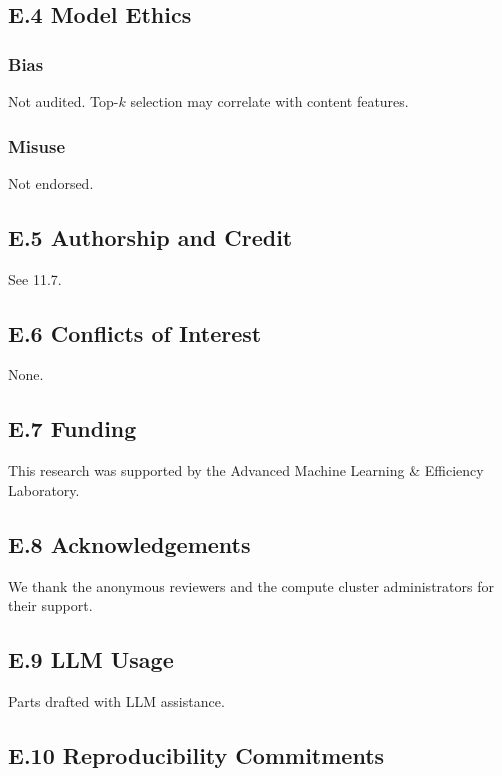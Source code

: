\subsection{E.4 Model Ethics}

\subsubsection{Bias}
Not audited. Top-$k$ selection may correlate with content features.

\subsubsection{Misuse}
Not endorsed.

\subsection{E.5 Authorship and Credit}

See  11.7.

\subsection{E.6 Conflicts of Interest}

None.

\subsection{E.7 Funding}

This research was supported by the Advanced Machine Learning & Efficiency Laboratory.

\subsection{E.8 Acknowledgements}

We thank the anonymous reviewers and the compute cluster administrators for their support.

\subsection{E.9 LLM Usage}

Parts drafted with LLM assistance.

\subsection{E.10 Reproducibility Commitments}

